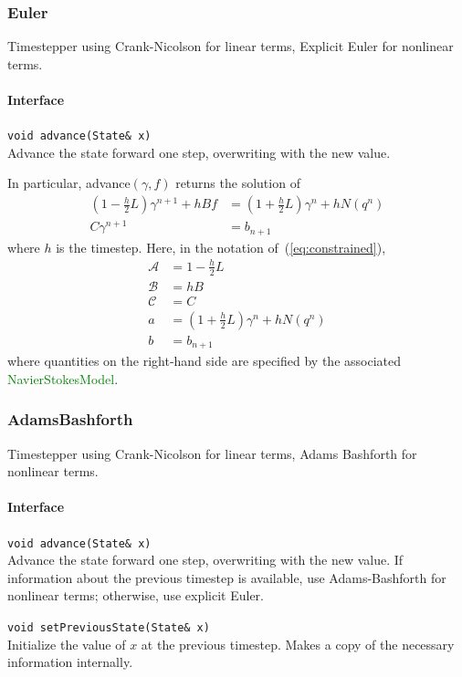 \documentclass[11pt]{article}
\def\class#1{\textcolor{green}{\ttfamily\small #1}} %
\def\fn#1{{\ttfamily\small #1}} %
\let\code\lstinline
\begin{document}
\subsubsection{Euler}
Timestepper using Crank-Nicolson for linear terms, Explicit Euler for nonlinear terms.

\paragraph{Interface}
\begin{description}
	\item \code|void advance(State& x)|\\
		Advance the state forward one step, overwriting with the new value.  
\end{description}

In particular, \fn{advance}$(\gamma,f)$ returns the solution of
	\begin{align}
		(1-\frac{h}{2}L)\gamma^{n+1} + hBf &= (1 + \frac{h}{2}L)\gamma^n + h N(q^n)\\
		C\gamma^{n+1} &= b_{n+1}
	\end{align}
where $h$ is the timestep.  Here, in the notation of~(\ref{eq:constrained}),
\begin{align}
	\mathcal{A} &= 1-\frac{h}{2} L\\
	\mathcal{B} &= hB\\
	\mathcal{C} &= C\\
	a &= (1+\frac{h}{2}L)\gamma^n + hN(q^n)\\
	b &= b_{n+1}
\end{align}
where quantities on the right-hand side are specified by the associated \class{NavierStokesModel}.

\subsubsection{AdamsBashforth}
Timestepper using Crank-Nicolson for linear terms, Adams Bashforth for nonlinear terms.

\paragraph{Interface}
\begin{description}
	\item \code|void advance(State& x)|\\
		Advance the state forward one step, overwriting with the new value.  If information about the previous timestep is available, use Adams-Bashforth for nonlinear terms; otherwise, use explicit Euler.
	\item \code|void setPreviousState(State& x)|\\
		Initialize the value of $x$ at the previous timestep.  Makes a copy of the necessary information internally.
\end{description}
\end{document}
